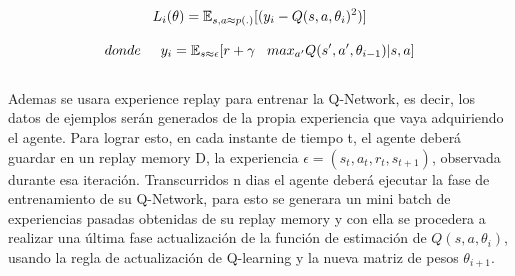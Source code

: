 \begin{equation}
L_i(\theta) = \operatorname{\mathbb{E}}_{s, a \approx p(.)}[(y_i - Q(s, a, \theta_i)^2)]
\\\\ 
\end{equation}

\begin{equation}
donde \hspace*{0.5cm}  y_i =  \operatorname{\mathbb{E}}_{s \approx \epsilon}[r + \gamma  \hspace*{0.3cm}  max_{a'} Q(s', a', \theta_{i-1}) | s, a]
\end{equation}
\\

Ademas se usara  experience replay para entrenar la Q-Network, es decir, los datos de ejemplos serán generados de la propia experiencia que vaya adquiriendo el agente. Para lograr esto, en cada instante de tiempo t, el agente deberá guardar en un replay memory D, la experiencia $\epsilon = (s_t, a_t, r_t, s_{t+1})$, observada durante esa iteración.
Transcurridos n dias el agente deberá ejecutar la fase de entrenamiento de su Q-Network, para esto se generara un mini batch de experiencias pasadas obtenidas de  su replay memory y con ella se procedera a realizar una última fase actualización de la función de estimación de $Q(s, a, \theta_i)$, usando la regla de actualización de Q-learning y la nueva matriz de pesos $\theta_{i+1}$.





